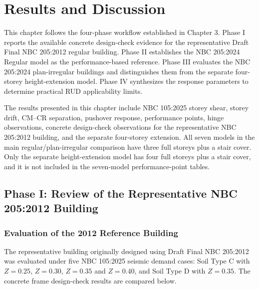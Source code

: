 \chapter[RESULTS AND DISCUSSION]{Results and Discussion}


This chapter follows the four-phase workflow established in Chapter 3. Phase I reports the available concrete design-\allowbreak{}check evidence for the representative Draft Final NBC 205:2012 regular building. Phase II establishes the NBC 205:2024 Regular model as the performance-based reference. Phase III evaluates the NBC 205:2024 plan-irregular buildings and distinguishes them from the separate four-storey height-extension model. Phase IV synthesizes the response parameters to determine practical RUD applicability limits.

The results presented in this chapter include NBC 105:2025 storey shear, storey drift, CM--CR separation, pushover response, performance points, hinge observations, concrete design-check observations for the representative NBC 205:2012 building, and the separate four-storey extension. All seven models in the main regular/plan-irregular comparison have three full storeys plus a stair cover. Only the separate height-extension model has four full storeys plus a stair cover, and it is not included in the seven-model performance-point tables.

\section{Phase I: Review of the Representative NBC 205:2012 Building}
\subsection{Evaluation of the 2012 Reference Building}
The representative building originally designed using Draft Final NBC 205:2012 was evaluated under five NBC 105:2025 seismic demand cases: Soil Type C with $Z=0.25$, $Z=0.30$, $Z=0.35$ and $Z=0.40$, and Soil Type D with $Z=0.35$. The concrete frame design-check results are compared below.

